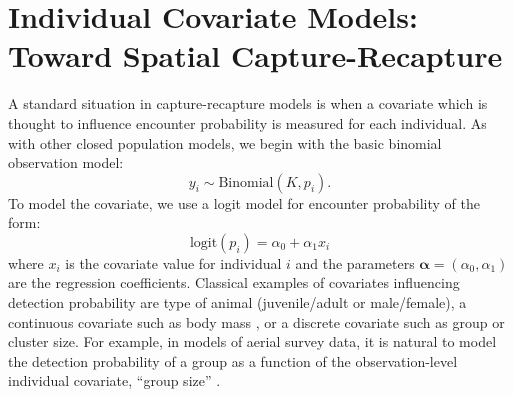 \section{Individual Covariate Models: Toward Spatial Capture-Recapture}
\label{closed.sec.indcov}


A standard situation in capture-recapture models is when a covariate
which is thought to influence encounter probability is measured for
each individual.  As with other closed population models, we begin
with the basic binomial observation model:
\[
y_{i} \sim \mbox{Binomial}(K, p_{i}).
\]
To model the covariate, we use a logit model for encounter probability
of the form:
\begin{equation}
 \mbox{logit}(p_{i}) = \alpha_0 + \alpha_1 x_{i}
\label{closed.eq.ha}
\end{equation}
where $x_i$ is the covariate value for individual $i$ and the
parameters $\bm{\alpha}= (\alpha_0, \alpha_1)$ are the regression coefficients. Classical
examples of covariates influencing detection probability are type of
animal (juvenile/adult or male/female), a continuous covariate such as
body mass \citep[e.g.,][Chapt. 6]{royle_dorazio:2008}, or a discrete covariate
such as group or cluster size. For example, in models of aerial survey
data, it is natural to model the detection probability of a group as a
function of the observation-level individual covariate, ``group size''
\citep{royle:2008, royle:2009, langtimm_etal:2011}.

